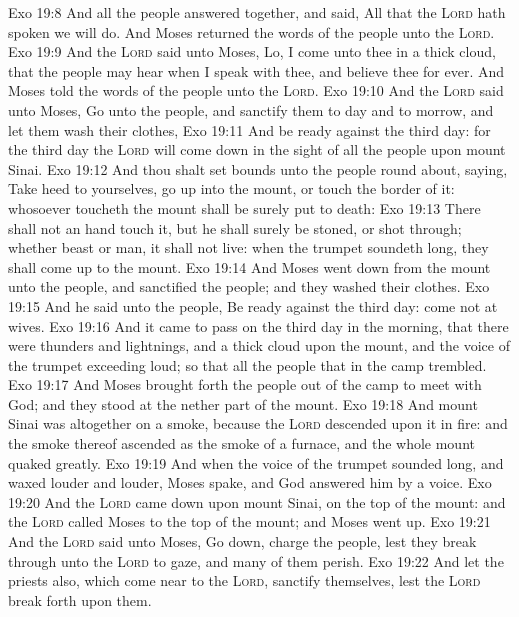 \vs Exo 19:8 And all the people answered together, and said, All that the \textsc{Lord} hath spoken we will do. And Moses returned the words of the people unto the \textsc{Lord}.
\vs Exo 19:9 And the \textsc{Lord} said unto Moses, Lo, I come unto thee in a thick cloud, that the people may hear when I speak with thee, and believe thee for ever. And Moses told the words of the people unto the \textsc{Lord}.
\vs Exo 19:10 And the \textsc{Lord} said unto Moses, Go unto the people, and sanctify them to day and to morrow, and let them wash their clothes,
\vs Exo 19:11 And be ready against the third day: for the third day the \textsc{Lord} will come down in the sight of all the people upon mount Sinai.
\vs Exo 19:12 And thou shalt set bounds unto the people round about, saying, Take heed to yourselves,  go  up into the mount, or touch the border of it: whosoever toucheth the mount shall be surely put to death:
\vs Exo 19:13 There shall not an hand touch it, but he shall surely be stoned, or shot through; whether  beast or man, it shall not live: when the trumpet soundeth long, they shall come up to the mount.
\vs Exo 19:14 And Moses went down from the mount unto the people, and sanctified the people; and they washed their clothes.
\vs Exo 19:15 And he said unto the people, Be ready against the third day: come not at  wives.
\vs Exo 19:16 And it came to pass on the third day in the morning, that there were thunders and lightnings, and a thick cloud upon the mount, and the voice of the trumpet exceeding loud; so that all the people that  in the camp trembled.
\vs Exo 19:17 And Moses brought forth the people out of the camp to meet with God; and they stood at the nether part of the mount.
\vs Exo 19:18 And mount Sinai was altogether on a smoke, because the \textsc{Lord} descended upon it in fire: and the smoke thereof ascended as the smoke of a furnace, and the whole mount quaked greatly.
\vs Exo 19:19 And when the voice of the trumpet sounded long, and waxed louder and louder, Moses spake, and God answered him by a voice.
\vs Exo 19:20 And the \textsc{Lord} came down upon mount Sinai, on the top of the mount: and the \textsc{Lord} called Moses  to the top of the mount; and Moses went up.
\vs Exo 19:21 And the \textsc{Lord} said unto Moses, Go down, charge the people, lest they break through unto the \textsc{Lord} to gaze, and many of them perish.
\vs Exo 19:22 And let the priests also, which come near to the \textsc{Lord}, sanctify themselves, lest the \textsc{Lord} break forth upon them.
